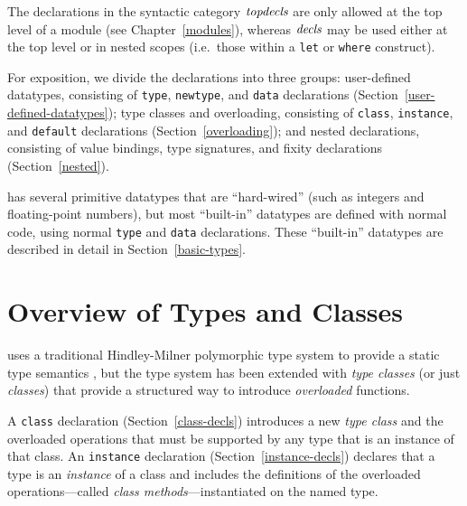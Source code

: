 %
%
%
%
%
%
%
%
%
%
%
%
%

The declarations in the syntactic category \mbox{$\it topdecls$} are only allowed
at the top level of a \Haskell{} module (see
Chapter~\ref{modules}), whereas \mbox{$\it decls$} may be used either at the top level or
in nested scopes (i.e.~those within a \mbox{\tt let} or \mbox{\tt where} construct).

For exposition, we divide the declarations into
three groups: user-defined datatypes, consisting of \mbox{\tt type}, \mbox{\tt newtype},
and \mbox{\tt data} 
declarations (Section~\ref{user-defined-datatypes}); type classes and
overloading, consisting of \mbox{\tt class}, \mbox{\tt instance}, and \mbox{\tt default}
declarations (Section~\ref{overloading}); and nested declarations,
consisting of value bindings, type signatures, and fixity declarations
(Section~\ref{nested}).


\Haskell{} has several primitive datatypes that are ``hard-wired''
(such as integers and floating-point numbers), but most ``built-in''
datatypes are defined with normal \Haskell{} code, using normal \mbox{\tt type}
and \mbox{\tt data} declarations. %
These ``built-in'' datatypes are described in detail in
Section~\ref{basic-types}.

\section{Overview of Types and Classes}
\label{types-overview}

\Haskell{} uses a traditional
Hindley-Milner
polymorphic type system to provide a static type semantics
\cite{damas-milner82,hindley69}, but the type system has been extended with
{\em type classes} (or just {\em
classes}) that provide 
a structured way to introduce {\em overloaded} functions.  

A \mbox{\tt class} declaration (Section~\ref{class-decls}) introduces a new
{\em type class} and the overloaded operations that must be
supported by any type that is an instance of that class.  An
\mbox{\tt instance} declaration (Section~\ref{instance-decls}) declares that a
type is an {\em instance} of a class and includes
the definitions of the overloaded operations---called {\em
class methods}---instantiated on the named type.

